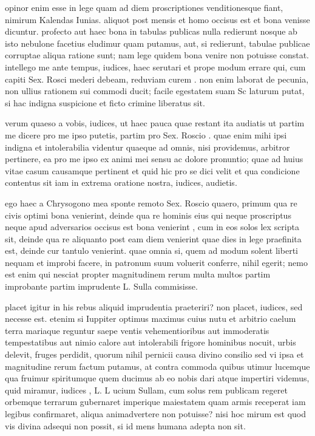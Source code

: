  opinor enim esse in lege quam ad diem proscriptiones venditionesque fiant, nimirum Kalendas Iunias. aliquot post mensis et homo occisus est et bona venisse dicuntur. profecto aut haec bona in tabulas publicas nulla redierunt nosque ab isto nebulone facetius eludimur quam putamus, aut, si redierunt, tabulae publicae corruptae aliqua ratione sunt; nam lege quidem bona venire non potuisse constat. intellego me ante tempus, iudices, haec serutari et prope modum errare qui, cum capiti Sex. Rosci mederi debeam, reduviam curem . non enim laborat de pecunia, non ullius rationem sui commodi ducit; facile egestatem suam Sc laturum putat, si hac indigna suspicione et ficto crimine liberatus sit.

 verum quaeso a vobis, iudices, ut haec pauca quae restant ita audiatis ut partim me dicere pro me ipso putetis, partim pro Sex. Roscio . quae enim mihi ipsi indigna et intolerabilia videntur quaeque ad omnis, nisi providemus, arbitror pertinere, ea pro me ipso ex animi mei sensu ac dolore pronuntio; quae ad huius vitae casum causamque pertinent et quid hic pro se dici velit et qua condicione contentus sit iam in extrema oratione nostra, iudices, audietis.

 ego haec a Chrysogono mea sponte remoto Sex. Roscio quaero, primum qua re civis optimi bona venierint, deinde qua re hominis eius qui neque proscriptus neque apud adversarios occisus est bona venierint , cum in eos solos lex scripta sit, deinde qua re aliquanto post eam diem venierint quae dies in lege praefinita est, deinde cur tantulo venierint. quae omnia si, quem ad modum solent liberti nequam et improbi facere, in patronum suum voluerit conferre, nihil egerit; nemo est enim qui nesciat propter magnitudinem rerum multa multos partim improbante partim imprudente L. Sulla commisisse.

 placet igitur in his rebus aliquid imprudentia praeteriri? non placet, iudices, sed necesse est. etenim si Iuppiter optimus maximus cuius nutu et arbitrio caelum terra mariaque reguntur saepe ventis vehementioribus aut immoderatis tempestatibus aut nimio calore aut intolerabili frigore hominibus nocuit, urbis delevit, fruges perdidit, quorum nihil pernicii causa divino consilio sed vi ipsa et magnitudine rerum factum putamus, at contra commoda quibus utimur lucemque qua fruimur spiritumque quem ducimus ab eo nobis dari atque impertiri videmus, quid miramur, iudices , L. L ucium Sullam, cum solus rem publicam regeret orbemque terrarum gubernaret imperique maiestatem quam armis receperat iam legibus confirmaret, aliqua animadvertere non potuisse? nisi hoc mirum est quod vis divina adsequi non possit, si id mens humana adepta non sit.

